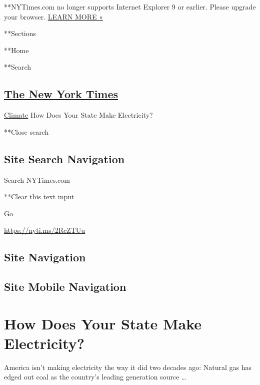  **NYTimes.com no longer supports Internet Explorer 9 or earlier. Please
upgrade your browser.
\href{http://www.nytimes3xbfgragh.onion/content/help/site/ie9-support.html}{LEARN
MORE »}

**Sections

**Home

**Search

\hypertarget{the-new-york-times}{%
\subsection{\texorpdfstring{\href{http://www.nytimes3xbfgragh.onion/}{The
New York Times}}{The New York Times}}\label{the-new-york-times}}

 \href{/section/climate}{Climate} \textbar{}How Does Your State Make
Electricity?

**Close search

\hypertarget{site-search-navigation}{%
\subsection{Site Search Navigation}\label{site-search-navigation}}

Search NYTimes.com

**Clear this text input

Go

\url{https://nyti.ms/2RcZTUu}

\hypertarget{site-navigation}{%
\subsection{Site Navigation}\label{site-navigation}}

\hypertarget{site-mobile-navigation}{%
\subsection{Site Mobile Navigation}\label{site-mobile-navigation}}

\hypertarget{how-does-your-state-make-electricity}{%
\section{How Does Your State Make
Electricity?}\label{how-does-your-state-make-electricity}}

America isn't making electricity the way it did two decades ago: Natural
gas has edged out coal as the country's leading generation source
\ldots{}

